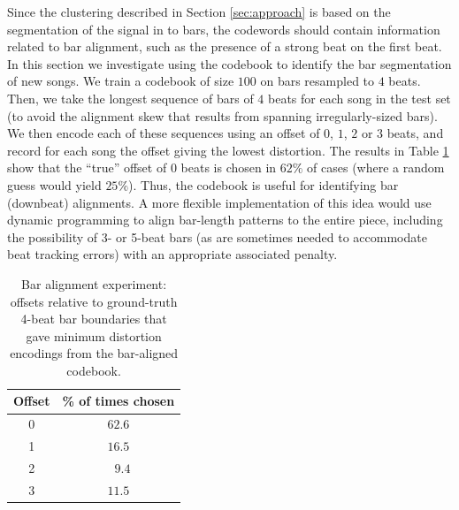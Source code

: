 \documentclass{article}
\begin{document}
Since the clustering described in Section \ref{sec:approach} is based
on the segmentation of the signal in to bars, 
the codewords should contain information related to bar
alignment, such as the presence of a strong beat on the first beat.
%
In this section we investigate using the codebook to identify the
bar segmentation of new songs.  
We train a codebook of size $100$ on bars resampled to $4$ beats. Then,
we take the longest sequence of bars of $4$ beats for each song
in the test set (to avoid the alignment skew that results from spanning 
irregularly-sized bars).  
We then encode each of these sequences using an offset
of $0$, $1$, $2$ or $3$ beats, and record for each song 
the offset giving the lowest distortion.  
%
The results in Table \ref{tab:offset}
show that the ``true'' offset of $0$ beats is chosen in $62\%$ of cases (where a random 
guess would yield $25\%$).  Thus, the codebook is useful for identifying bar (downbeat) 
alignments.  A more flexible implementation of this idea would use dynamic 
programming to align bar-length patterns to the entire piece, including the 
possibility of 3- or 5-beat bars (as are sometimes needed to accommodate 
beat tracking errors) with an appropriate associated penalty.  



\begin{table}
\begin{center}
\begin{tabular}{cc}
\toprule
Offset & \% of times chosen \\
\midrule
0 & $\mathbf{62.6}$\\
1 & $16.5$\\
2 & $\text{ }9.4$\\
3 & $11.5$\\
\bottomrule
\end{tabular}
\end{center}
\caption{\small{
Bar alignment experiment:
offsets relative to ground-truth 4-beat bar boundaries 
that gave minimum distortion encodings from the bar-aligned codebook.
}}
\label{tab:offset}
\end{table}
\end{document}
